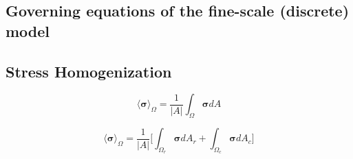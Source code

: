 \subsection{Governing equations of the fine-scale (discrete) model}

\subsection{Stress Homogenization}

\begin{equation}
\label{eqn:stressav}
\langle \boldsymbol{\sigma} \rangle_\Omega = \frac{1}{\vert A \vert} \int_\Omega \boldsymbol{\sigma} { dA}
\end{equation}

\begin{equation}
\label{eqn:stresssplit}
\langle \boldsymbol{\sigma} \rangle_\Omega = \frac{1}{\vert A \vert} \bigg \lbrack {\int_{\Omega_{r}} \boldsymbol{\sigma} { dA_r} + \int_{\Omega_{c}} \boldsymbol{\sigma} { dA_c}} \bigg \rbrack
\end{equation}
